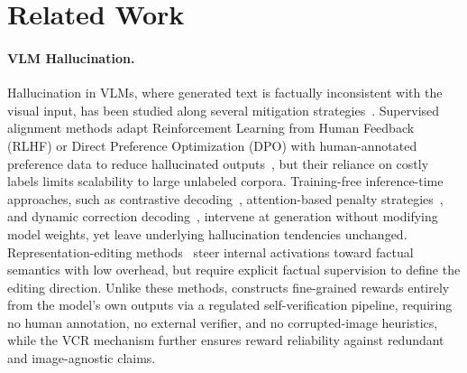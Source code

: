 \section{Related Work}
\label{sec:related_work}

\paragraph{VLM Hallucination.}
Hallucination in VLMs, where generated text is factually inconsistent with the visual input, has been studied along several mitigation strategies~\cite{li2023pope,wang2023amber}.
Supervised alignment methods adapt Reinforcement Learning from Human Feedback (RLHF) or Direct Preference Optimization (DPO) with human-annotated preference data to reduce hallucinated outputs~\cite{sun2023llava_rlhf,yu2023rlhfv,zhao2024hdpo,li2025dpo,ying2025empo}, but their reliance on costly labels limits scalability to large unlabeled corpora.
Training-free inference-time approaches, such as contrastive decoding~\cite{leng2023vcd}, attention-based penalty strategies~\cite{huang2023opera}, and dynamic correction decoding~\cite{wang2024deco,tang2025farsight,yin2025clearsight,anand2026crops}, intervene at generation without modifying model weights, yet leave underlying hallucination tendencies unchanged.
Representation-editing methods~\cite{jiang2024interp,wang2026after} steer internal activations toward factual semantics with low overhead, but require explicit factual supervision to define the editing direction.
Unlike these methods, \ours constructs fine-grained rewards entirely from the model's own outputs via a regulated self-verification pipeline, requiring no human annotation, no external verifier, and no corrupted-image heuristics, while the VCR mechanism further ensures reward reliability against redundant and image-agnostic claims.




